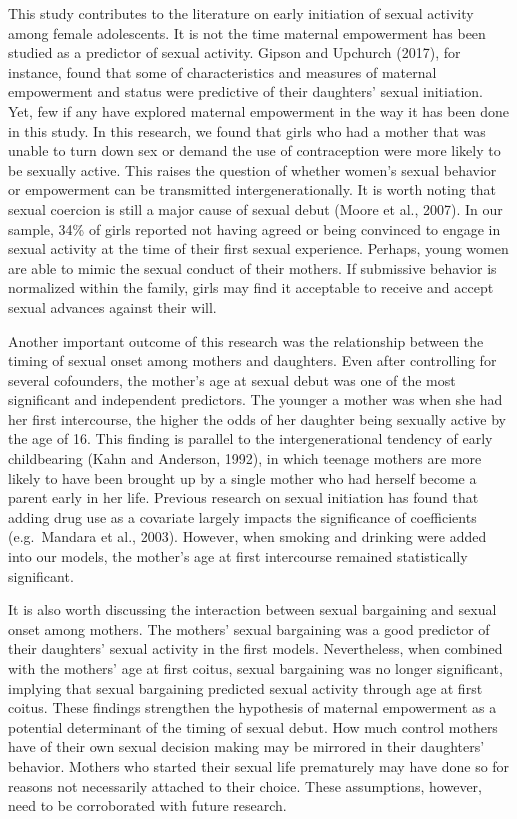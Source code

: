 \documentclass[
]{article}
\begin{document}
This study contributes to the literature on early initiation of sexual
activity among female adolescents. It is not the time maternal
empowerment has been studied as a predictor of sexual activity. Gipson
and Upchurch (2017), for instance, found that some of characteristics
and measures of maternal empowerment and status were predictive of their
daughters' sexual initiation. Yet, few if any have explored maternal
empowerment in the way it has been done in this study. In this research,
we found that girls who had a mother that was unable to turn down sex or
demand the use of contraception were more likely to be sexually active.
This raises the question of whether women's sexual behavior or
empowerment can be transmitted intergenerationally. It is worth noting
that sexual coercion is still a major cause of sexual debut (Moore et
al., 2007). In our sample, 34\% of girls reported not having agreed or
being convinced to engage in sexual activity at the time of their first
sexual experience. Perhaps, young women are able to mimic the sexual
conduct of their mothers. If submissive behavior is normalized within
the family, girls may find it acceptable to receive and accept sexual
advances against their will.

Another important outcome of this research was the relationship between
the timing of sexual onset among mothers and daughters. Even after
controlling for several cofounders, the mother's age at sexual debut was
one of the most significant and independent predictors. The younger a
mother was when she had her first intercourse, the higher the odds of
her daughter being sexually active by the age of 16. This finding is
parallel to the intergenerational tendency of early childbearing (Kahn
and Anderson, 1992), in which teenage mothers are more likely to have
been brought up by a single mother who had herself become a parent early
in her life. Previous research on sexual initiation has found that
adding drug use as a covariate largely impacts the significance of
coefficients (e.g.~Mandara et al., 2003). However, when smoking and
drinking were added into our models, the mother's age at first
intercourse remained statistically significant.

It is also worth discussing the interaction between sexual bargaining
and sexual onset among mothers. The mothers' sexual bargaining was a
good predictor of their daughters' sexual activity in the first models.
Nevertheless, when combined with the mothers' age at first coitus,
sexual bargaining was no longer significant, implying that sexual
bargaining predicted sexual activity through age at first coitus. These
findings strengthen the hypothesis of maternal empowerment as a
potential determinant of the timing of sexual debut. How much control
mothers have of their own sexual decision making may be mirrored in
their daughters' behavior. Mothers who started their sexual life
prematurely may have done so for reasons not necessarily attached to
their choice. These assumptions, however, need to be corroborated with
future research.
\end{document}
